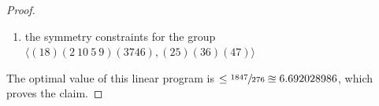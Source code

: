 \documentclass[11pt, a4paper]{kybernetika}
\begin{document}
\begin{proof}
\begin{enumerate}
\begin{itemize}
				$X_1,X_2,X_2',X_3,X_4,X_5,X_6,X_7,X_8,X_9,X_{10}$
				\item those that appear in the copy steps of the item~\ref{hgcl-i2} above: 
				
				$X_1,X_2,X_3,X_4,X_4'',X_5,X_5'',X_6,X_7,X_7''',X_8,X_9,X_{10}$
				\item those that appear in the copy steps of the item~\ref{hgcl-i3} above: 
				
				$X_1,X_2,X_3,X_4,X_5,X_6,X_6'''',X_7,X_7'''',X_8,X_8''''',X_9,X_{10}$
			\end{itemize}
			\item the symmetry constraints for the group $\langle(18)(2\ 10\ 5\ 9)(3746),(25)(36)(47)\rangle$ 
		\end{enumerate}
		The optimal value of this linear program is $\le\sfrac{1847}{276}\approxeq6.692028986$, which proves the claim.
	\end{proof}
	
\end{document}

